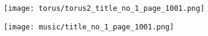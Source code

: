 \begin{figure}[H]
{
  \begin{adjustbox}{width=14cm,center}
    \texttt{[image: torus/torus2\_title\_no\_1\_page\_1001.png]}%
  \end{adjustbox}
}\caption[]{}
\end{figure}

\begin{figure}[H]
{
  \begin{adjustbox}{width=14cm,center}
    \texttt{[image: music/title\_no\_1\_page\_1001.png]}%
  \end{adjustbox}
}\caption[]{}
\end{figure}

